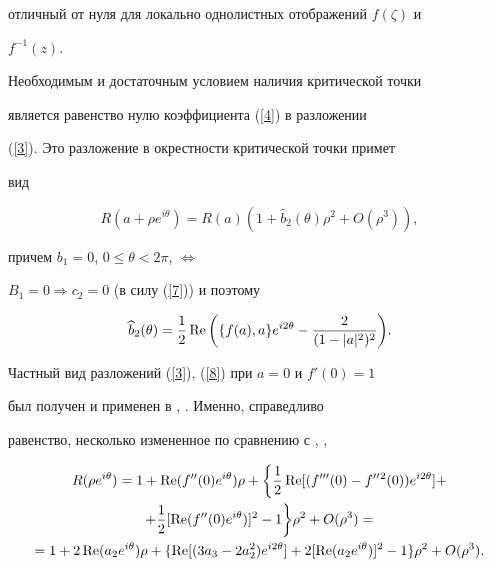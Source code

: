 отличный от нуля для локально однолистных отображений $f(\zeta)$ и


$f^{-1}(z)$.





Необходимым и достаточным условием наличия критической точки


является равенство нулю коэффициента (\ref{4}) в разложении


(\ref{3}). Это разложение в окрестности критической точки примет


вид


\begin{equation}\label{8}


R(a+\rho e^{i\theta})=R(a)(1+\widehat{b}_2(\theta)\rho^2+O(\rho^3)),


\end{equation}


причем $b_1=0$, $0\leq \theta <2\pi$, $\Leftrightarrow$


$B_1=0\Rightarrow c_2=0$ (в силу (\ref{7})) и поэтому


\begin{equation}\label{9}


\widehat{b}_2(\theta)=\frac12\re\bigg(\{f(a),a\} e^{i2\theta}-


\frac{2}{(1-|a|^2)^2}\bigg).


\end{equation}





Частный вид разложений (\ref{3}), (\ref{8}) при $a=0$ и $f'(0)=1$


был получен и применен в \cite{2}, \cite{3}. Именно, справедливо


равенство, несколько измененное по сравнению с \cite{2}, \cite{3},


\begin{gather*}


R(\rho e^{i\theta})=1+\re(f''(0)e^{i\theta})\rho+


\bigg\{\frac12\re[(f'''(0)-f''{}^2(0))e^{i2\theta}]+\\


+\frac12[\re(f''(0)e^{i\theta})]^2-1\bigg\}\rho^2+O(\rho^3)=\\


=1+2\re(a_2e^{i\theta})\rho+\{\re[(3a_3-2a_2^2)e^{i2\theta}]+


2[\re(a_2e^{i\theta})]^2-1\}\rho^2+O(\rho^3).


\end{gather*}





